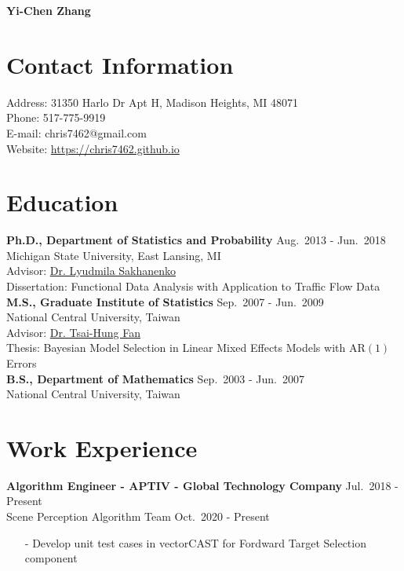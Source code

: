 \documentclass[a4paper,10pt,dvipdfmx]{article}
\begin{document}
\begin{center}
  {\huge \textbf{Yi-Chen Zhang}}
\end{center}

\section*{Contact Information}
\indent Address: 31350 Harlo Dr Apt H, Madison Heights, MI 48071\\
\indent Phone: 517-775-9919\\
\indent E-mail: chris7462@gmail.com\\
\indent Website: \href{https://chris7462.github.io}{https://chris7462.github.io}\\

\section*{Education}
\indent \textbf{Ph.D., Department of Statistics and Probability} \hfill Aug.~2013 - Jun.~2018\\
\indent Michigan State University, East Lansing, MI\\
\indent Advisor: \href{https://www.stt.msu.edu/users/luda/}{Dr. Lyudmila Sakhanenko}\\
\indent Dissertation: Functional Data Analysis with Application to Traffic Flow Data\\

\indent \textbf{M.S., Graduate Institute of Statistics} \hfill Sep.~2007 - Jun.~2009\\
\indent National Central University, Taiwan\\
\indent Advisor: \href{http://www.stat.ncu.edu.tw/teacher/THFan/index.htm}{Dr. Tsai-Hung Fan}\\
\indent Thesis: Bayesian Model Selection in Linear Mixed Effects Models with AR$(1)$ Errors\\

\indent \textbf{B.S., Department of Mathematics} \hfill Sep.~2003 - Jun.~2007\\
\indent National Central University, Taiwan

\section*{Work Experience}
\indent \textbf{Algorithm Engineer - APTIV - Global Technology Company} \hfill Jul.~2018 - Present\\
\indent Scene Perception Algorithm Team \hfill Oct.~2020 - Present
\begin{itemize}[noitemsep,nolistsep,leftmargin=12mm]
  \item[-] Develop unit test cases in vectorCAST for Fordward Target Selection component
\end{itemize}
\end{document}
